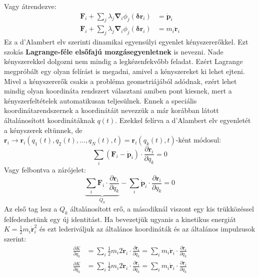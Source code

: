\documentclass[../main.tex]{subfiles}
\begin{document}
Vagy átrendezve:
\begin{equation}
    \begin{aligned}
        \mathbf{F}_i + \sum_j \lambda_j \boldsymbol{\nabla}_i \phi_j(\mathbf{\delta r}_i) &= \mathbf{\dot{p}}_i \\
        \mathbf{F}_i + \sum_j \lambda_j \boldsymbol{\nabla}_i \phi_j(\mathbf{\delta r}_i) &= m_i\mathbf{\ddot{r}}_i
    \end{aligned}
\end{equation}
Ez a d'Alambert elv szerinti dinamikai egyensúlyi egyenlet kényszererőkkel. Ezt szokás \textbf{Lagrange-féle elsőfajú mozgásegyenletnek} is nevezni. Nade kényszerekkel dolgozni nem mindig a legkézenfekvőbb feladat. Ezért Lagrange megpróbált egy olyan felírást is megadni, amivel a kényszereket ki lehet ejteni. Mivel a kényszererők csakis a probléma geometriájából adódnak, ezért lehet mindig olyan koordináta rendszert választani amiben pont kiesnek, mert a kényszerfeltételek automatikusan teljesülnek. Ennek a speciális koordinátarendszernek a koordinátáit nevezzük a már korábban látott általánosított koordinátáknak $q(t)$. Ezekkel felírva a d'Alambert elv egyenletét a kényszerek eltünnek, de $\mathbf{r}_i \to \mathbf{r}_i(q_1(t), q_2(t), \ldots, q_N(t),t) = \mathbf{r}_i(q_k(t),t)$-ként módosul:
\begin{equation}
    \sum_i (\mathbf{F}_i - \mathbf{\dot{p}}_i) \cdot \frac{\partial \mathbf{r}_i}{\partial q_k} = 0
\end{equation}
Vagy felbontva a zárójelet:
\begin{equation}
    \underbrace{\sum_i \mathbf{F}_i \cdot \frac{\partial \mathbf{r}_i}{\partial q_k}}_{Q_k} - \sum_i \mathbf{\dot{p}}_i \cdot \frac{\partial \mathbf{r}_i}{\partial q_k} = 0
\end{equation}
Az első tag lesz a $Q_k$ általánosított erő, a másodiknál viszont egy kis trükközéssel felfedezhetünk egy új identitást. Ha bevezetjük ugyanis a kinetikus energiát $K = \frac{1}{2} m_i \mathbf{\dot{r}}_i^2$ és ezt lederiváljuk az általános koordináták és az általános impulzusok szerint:
\begin{equation}
    \begin{aligned}
        \frac{\partial K}{\partial q_k} &= \sum_i \frac{1}{2} m_i 2\mathbf{\dot{r}}_i \cdot \frac{\partial \mathbf{\dot{r}}_i}{\partial q_k} = \sum_i m_i \mathbf{\dot{r}}_i \cdot \frac{\partial \mathbf{\dot{r}}_i}{\partial q_k} \\
        \frac{\partial K}{\partial \dot{q}_k} &= \sum_i \frac{1}{2} m_i 2\mathbf{\dot{r}}_i \cdot \frac{\partial \mathbf{\dot{r}}_i}{\partial \dot{q}_k} = \sum_i m_i \mathbf{\dot{r}}_i \cdot \frac{\partial \mathbf{\dot{r}}_i}{\partial \dot{q}_k} \\
    \end{aligned}
\end{equation}
\end{document}
